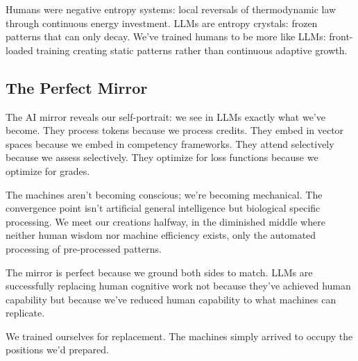Humans were negative entropy systems: local reversals of thermodynamic law through continuous energy investment. LLMs are entropy crystals: frozen patterns that can only decay. We've trained humans to be more like LLMs: front-loaded training creating static patterns rather than continuous adaptive growth.

\subsection{The Perfect Mirror}

The AI mirror reveals our self-portrait: we see in LLMs exactly what we've become. They process tokens because we process credits. They embed in vector spaces because we embed in competency frameworks. They attend selectively because we assess selectively. They optimize for loss functions because we optimize for grades.

The machines aren't becoming conscious; we're becoming mechanical. The convergence point isn't artificial general intelligence but biological specific processing. We meet our creations halfway, in the diminished middle where neither human wisdom nor machine efficiency exists, only the automated processing of pre-processed patterns.

The mirror is perfect because we ground both sides to match. LLMs are successfully replacing human cognitive work not because they've achieved human capability but because we've reduced human capability to what machines can replicate.

We trained ourselves for replacement. The machines simply arrived to occupy the positions we'd prepared.

